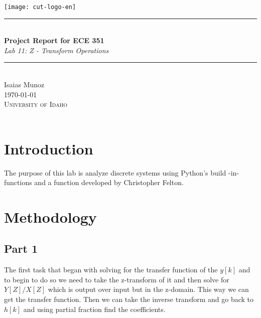 \documentclass[12pt,a4paper]{article}
\newcommand{\HRule}{\rule{\linewidth}{0.5mm}}
\begin{document}
\begin{titlepage}
\begin{center}
\texttt{[image: cut-logo-en]}~\\[2cm]
\HRule \\[0.4cm]
{ \LARGE 
  \textbf{Project Report for ECE 351}\\[0.4cm]
  \emph{Lab 11: Z - Transform Operations}\\[0.4cm]
}
\HRule \\[1.5cm]
{ \large
  Isaias Munoz  \\[0.1cm]
  \today\\[0.1cm]
}
\vfill
\textsc{\Large University of Idaho}\\
\\
 
\end{center}
\end{titlepage}
\newpage
\tableofcontents
{}
\newpage
\setcounter{page}{1}
\section{Introduction}\label{sec:intro}

The purpose of this lab is analyze discrete systems using Python's build -in-functions and a function developed by Christopher Felton. 





\section{Methodology}\label{sec:meth}
\subsection{Part 1}
The first task that began with solving for the transfer function of the $y[k]$ and to begin to do so we need to take the z-transform of it and then solve for $Y[Z]/X[Z]$ which is output over input but in the z-domain. This way we can get the transfer function. Then we can take the inverse transform and go back to $h[k]$ and using partial fraction find the coefficients. 
\end{document}
